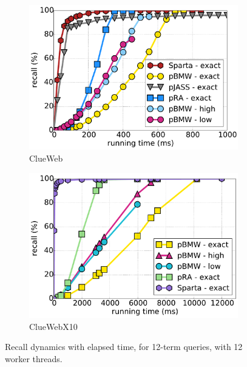 {{\begin{figure}[hbt]
\centering
      \begin{subfigure}[t]{0.4\textwidth}
         \includegraphics[width=\textwidth]{figures/cumulative_12threads_clueweb.pdf}
        \caption[]{ClueWeb}
        \label{fig:dynamics-clueweb}
      \end{subfigure}%
    \hfill %
      \begin{subfigure}[t]{0.4\textwidth}
      	\includegraphics[width=\textwidth]{figures/cumulative_12threads_cluewebX10.pdf}
	    \caption{ClueWebX10}
	\label{fig:dynamics-cluewebX10}
      \end{subfigure}  
       \caption{Recall dynamics with elapsed time, for 12-term queries, with 12 worker threads.}
       \label{fig:dynamics}
\end{figure}

}}
